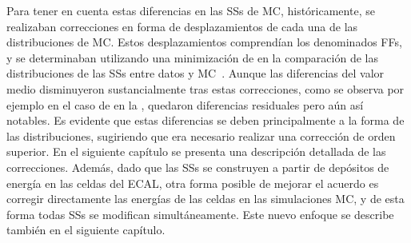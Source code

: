 Para tener en cuenta estas diferencias en las \acp{SS} de \ac{MC}, históricamente, se realizaban correcciones en forma de desplazamientos de cada una de las distribuciones de \ac{MC}. Estos desplazamientos comprendían los denominados \acfp{FF}, y se determinaban utilizando una minimización de \chisq en la comparación de las distribuciones de las \acp{SS} entre datos y \ac{MC}~\cite{ATLAS-EGamma-Performance-2015-2016,ATLAS-EGamma-Performance-2015-2017}.
Aunque las diferencias del valor medio disminuyeron sustancialmente tras estas correcciones, como se observa por ejemplo en el caso de \fside en la \Fig{\ref{fig:pid_ss:ss_differences:ss:fside}}, quedaron diferencias residuales pero a\'un as\'i notables.
Es evidente que estas diferencias se deben principalmente a la forma de las distribuciones, sugiriendo que era necesario realizar una corrección de orden superior.
En el siguiente capítulo se presenta una descripción detallada de las correcciones.
Además, dado que las \acp{SS} se construyen a partir de depósitos de energía en las celdas del \ac{ECAL}, otra forma posible de mejorar el acuerdo es corregir directamente las energías de las celdas en las simulaciones \ac{MC}, y de esta forma todas \acp{SS} se modifican simultáneamente. Este nuevo enfoque se describe también en el siguiente capítulo.